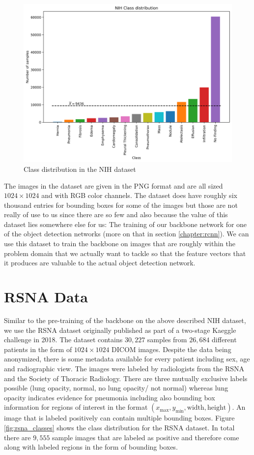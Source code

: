 \begin{figure}
	\centering
	\includegraphics[width=.8\linewidth]{img/nih_class_distribution.png}
	\caption{Class distribution in the NIH dataset}
	\label{fig:nih_classes}
\end{figure}

The images in the dataset are given in the PNG format and are all sized $1024 \times 1024$ and with RGB color channels. The dataset does have roughly six thousand entries for bounding boxes for some of the images but those are not really of use to us since there are so few and also because the value of this dataset lies somewhere else for us: The training of our backbone network for one of the object detection networks (more on that in section \vref{chapter:rcnn}). We can use this dataset to train the backbone on images that are roughly within the problem domain that we actually want to tackle so that the feature vectors that it produces are valuable to the actual object detection network. 

\section{RSNA Data}\label{data:rsna}

Similar to the pre-training of the backbone on the above described NIH dataset, we use the \ac{RSNA} dataset \autocite{RSNAKaeggle} originally published as part of a two-stage Kaeggle challenge in 2018. The dataset contains $30,227$ samples from $26,684$ different patients in the form of $1024 \times 1024$ DICOM images. Despite the data being anonymized, there is some metadata available for every patient including sex, age and radiographic view. The images were labeled by radiologists from the \ac{RSNA} and the Society of Thoracic Radiology. There are three mutually exclusive labels possible (lung opacity, normal, no lung opacity/ not normal) whereas lung opacity indicates evidence for pneumonia including also bounding box information for regions of interest in the format $(x_{\text{max}}, y_{\text{min}}, \text{width}, \text{height})$. An image that is labeled positively can contain multiple bounding boxes. Figure \ref{fig:rsna_classes} shows the class distribution for the \ac{RSNA} dataset. In total there are $9,555$ sample images that are labeled as positive and therefore come along with labeled regions in the form of bounding boxes.

